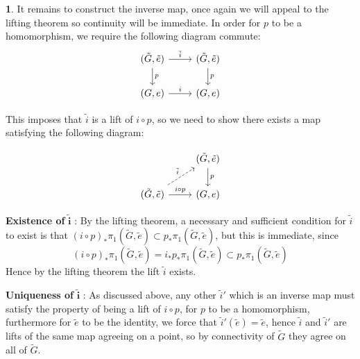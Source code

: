 \documentclass[10.5pt]{article}
\theoremstyle{definition}
\newtheorem{pb}{}
\begin{document}
\begin{pb}
        It remains to construct the inverse map, once again we will appeal to the lifting theorem so continuity will be immediate. In order for \(p\) to be a homomorphism, we require the following diagram commute:
        \begin{equation*} 
            \begin{tikzcd}
                (\tilde{G},\tilde{e})\arrow[r, "\tilde{i}"] \arrow[d, "p"]& (\tilde{G},\tilde{e})\arrow[d, "p"]\\
                (G,e)\arrow[r, "i"]& (G,e)
            \end{tikzcd}
        \end{equation*}

        This imposes that \(\tilde{i}\) is a lift of \(i \circ p\), so we need to show there exists a map satisfying the following diagram:

        \begin{equation*}
            \begin{tikzcd}
                &(\tilde{G},\tilde{e})\ar[d, "p"]\\
                (\tilde{G},\tilde{e})\ar[r, "i \circ p"]\ar[ru, "\tilde{i}", dashed]&(G,e)
                \end{tikzcd}
        \end{equation*}

        \textbf{Existence of }\(\mathbf{\tilde{i}}\) :
        By the lifting theorem, a necessary and sufficient condition for \(\tilde{i}\) to exist is that \((i \circ p)_* \pi_1(\tilde{G},\tilde{e}) \subset p_*\pi_1(\tilde{G},\tilde{e})\), but this is immediate, since
        \[(i \circ p)_* \pi_1(\tilde{G},\tilde{e}) = i_*p_*\pi_1(\tilde{G},\tilde{e}) \subset p_*\pi_1(\tilde{G},\tilde{e})\]
        Hence by the lifting theorem the lift \(\tilde{i}\) exists.

        \textbf{Uniqueness of }\(\mathbf{\tilde{i}}\) : As discussed above, any other \(\tilde{i}'\) which is an inverse map must satisfy the property of being a lift of \(i \circ p\), for \(p\) to be a homomorphism, furthermore for \(\tilde{e}\) to be the identity, we force that \(\tilde{i}'(\tilde{e}) = \tilde{e}\), hence \(\tilde{i}\) and \(\tilde{i}'\) are lifts of the same map agreeing on a point, so by connectivity of \(\tilde{G}\) they agree on all of \(\tilde{G}\).


\end{pb}
\end{document}
